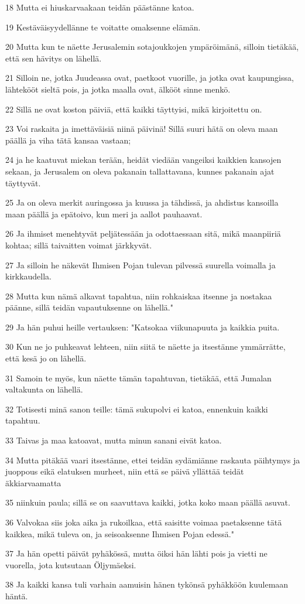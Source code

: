 \par 18 Mutta ei hiuskarvaakaan teidän päästänne katoa.
\par 19 Kestäväisyydellänne te voitatte omaksenne elämän.
\par 20 Mutta kun te näette Jerusalemin sotajoukkojen ympäröimänä, silloin tietäkää, että sen hävitys on lähellä.
\par 21 Silloin ne, jotka Juudeassa ovat, paetkoot vuorille, ja jotka ovat kaupungissa, lähtekööt sieltä pois, ja jotka maalla ovat, älkööt sinne menkö.
\par 22 Sillä ne ovat koston päiviä, että kaikki täyttyisi, mikä kirjoitettu on.
\par 23 Voi raskaita ja imettäväisiä niinä päivinä! Sillä suuri hätä on oleva maan päällä ja viha tätä kansaa vastaan;
\par 24 ja he kaatuvat miekan terään, heidät viedään vangeiksi kaikkien kansojen sekaan, ja Jerusalem on oleva pakanain tallattavana, kunnes pakanain ajat täyttyvät.
\par 25 Ja on oleva merkit auringossa ja kuussa ja tähdissä, ja ahdistus kansoilla maan päällä ja epätoivo, kun meri ja aallot pauhaavat.
\par 26 Ja ihmiset menehtyvät peljätessään ja odottaessaan sitä, mikä maanpiiriä kohtaa; sillä taivaitten voimat järkkyvät.
\par 27 Ja silloin he näkevät Ihmisen Pojan tulevan pilvessä suurella voimalla ja kirkkaudella.
\par 28 Mutta kun nämä alkavat tapahtua, niin rohkaiskaa itsenne ja nostakaa päänne, sillä teidän vapautuksenne on lähellä."
\par 29 Ja hän puhui heille vertauksen: "Katsokaa viikunapuuta ja kaikkia puita.
\par 30 Kun ne jo puhkeavat lehteen, niin siitä te näette ja itsestänne ymmärrätte, että kesä jo on lähellä.
\par 31 Samoin te myös, kun näette tämän tapahtuvan, tietäkää, että Jumalan valtakunta on lähellä.
\par 32 Totisesti minä sanon teille: tämä sukupolvi ei katoa, ennenkuin kaikki tapahtuu.
\par 33 Taivas ja maa katoavat, mutta minun sanani eivät katoa.
\par 34 Mutta pitäkää vaari itsestänne, ettei teidän sydämiänne raskauta päihtymys ja juoppous eikä elatuksen murheet, niin että se päivä yllättää teidät äkkiarvaamatta
\par 35 niinkuin paula; sillä se on saavuttava kaikki, jotka koko maan päällä asuvat.
\par 36 Valvokaa siis joka aika ja rukoilkaa, että saisitte voimaa paetaksenne tätä kaikkea, mikä tuleva on, ja seisoaksenne Ihmisen Pojan edessä."
\par 37 Ja hän opetti päivät pyhäkössä, mutta öiksi hän lähti pois ja vietti ne vuorella, jota kutsutaan Öljymäeksi.
\par 38 Ja kaikki kansa tuli varhain aamuisin hänen tykönsä pyhäkköön kuulemaan häntä.

